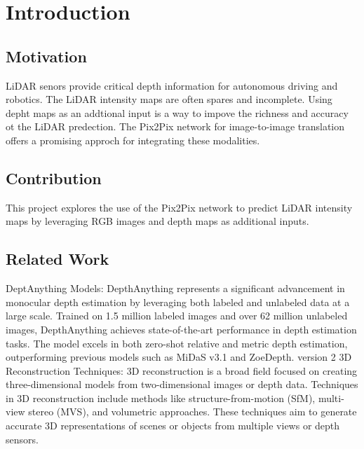 \chapter{Introduction}
\label{chap:intro}

\section{Motivation}
\label{sect:motivation}
LiDAR senors provide critical depth information for autonomous driving and robotics. The LiDAR intensity maps are often spares and incomplete. Using depht maps as an addtional input is a way to impove the richness and accuracy ot the LiDAR predection. The Pix2Pix network for image-to-image translation offers a promising approch for integrating these modalities. 
\section{Contribution}
This project explores the use of the Pix2Pix network to predict LiDAR intensity maps by leveraging RGB images and depth maps as additional inputs.
\section{Related Work}
DeptAnything Models: \newline DepthAnything represents a significant advancement in monocular depth estimation by leveraging both labeled and unlabeled data at a large scale. Trained on 1.5 million labeled images and over 62 million unlabeled images, DepthAnything achieves state-of-the-art performance in depth estimation tasks. The model excels in both zero-shot relative and metric depth estimation, outperforming previous models such as MiDaS v3.1 and ZoeDepth. 
\newline
version 2
\newline
3D Reconstruction Techniques: 3D reconstruction is a broad field focused on creating three-dimensional models from two-dimensional images or depth data. Techniques in 3D reconstruction include methods like structure-from-motion (SfM), multi-view stereo (MVS), and volumetric approaches. These techniques aim to generate accurate 3D representations of scenes or objects from multiple views or depth sensors.




